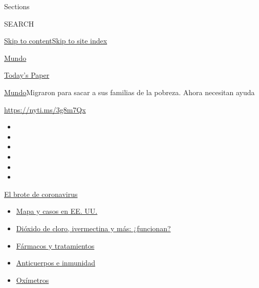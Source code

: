 Sections

SEARCH

\protect\hyperlink{site-content}{Skip to
content}\protect\hyperlink{site-index}{Skip to site index}

\href{https://www.nytimes.com/es/section/mundo}{Mundo}

\href{https://myaccount.nytimes.com/auth/login?response_type=cookie\&client_id=vi}{}

\href{https://www.nytimes.com/section/todayspaper}{Today's Paper}

\href{/es/section/mundo}{Mundo}\textbar{}Migraron para sacar a sus
familias de la pobreza. Ahora necesitan ayuda

\url{https://nyti.ms/3g8m7Qx}

\begin{itemize}
\item
\item
\item
\item
\item
\item
\end{itemize}

\href{https://www.nytimes.com/es/spotlight/coronavirus?action=click\&pgtype=Article\&state=default\&region=TOP_BANNER\&context=storylines_menu}{El
brote de coronavirus}

\begin{itemize}
\tightlist
\item
  \href{https://www.nytimes.com/es/interactive/2020/espanol/mundo/coronavirus-en-estados-unidos.html?action=click\&pgtype=Article\&state=default\&region=TOP_BANNER\&context=storylines_menu}{Mapa
  y casos en EE. UU.}
\item
  \href{https://www.nytimes.com/es/2020/07/23/espanol/america-latina/bolivia-cloro-coronavirus-ivermectina.html?action=click\&pgtype=Article\&state=default\&region=TOP_BANNER\&context=storylines_menu}{Dióxido
  de cloro, ivermectina y más: ¿funcionan?}
\item
  \href{https://www.nytimes.com/es/interactive/2020/science/coronavirus-tratamientos-curas.html?action=click\&pgtype=Article\&state=default\&region=TOP_BANNER\&context=storylines_menu}{Fármacos
  y tratamientos}
\item
  \href{https://www.nytimes.com/es/2020/07/28/espanol/ciencia-y-tecnologia/anticuerpos-coronavirus-inmunidad.html?action=click\&pgtype=Article\&state=default\&region=TOP_BANNER\&context=storylines_menu}{Anticuerpos
  e inmunidad}
\item
  \href{https://www.nytimes.com/es/2020/04/29/espanol/estilos-de-vida/oximetro-para-que-sirve.html?action=click\&pgtype=Article\&state=default\&region=TOP_BANNER\&context=storylines_menu}{Oxímetros}
\end{itemize}

